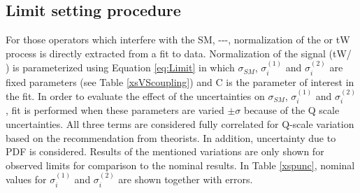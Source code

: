 \subsection {Limit setting procedure}
\label{tW_limit_set}
For those operators which interfere with the SM, \CG-\CtG-\Cphiq-\CtW, normalization of the \ttbar or tW process is directly extracted from a fit to data.
Normalization of the signal (tW/ \ttbar) is parameterized using Equation \ref{eq:Limit} in which $\sigma_{SM}$, $\sigma_i^{(1)}$ and $\sigma_{i}^{(2)}$ are fixed parameters (see Table \ref{xsVScoupling}) and C is the parameter of interest in the fit.
In order to evaluate the effect of the uncertainties on $\sigma_{SM}$, $\sigma_i^{(1)}$ and $\sigma_{i}^{(2)}$, fit is performed when these parameters are varied $\pm\sigma$ because of the Q scale uncertainties.
All three terms are considered fully correlated for Q-scale variation based on the recommendation from theorists.
In addition, uncertainty due to PDF is considered. Results of the mentioned variations are only shown for observed limits for comparison to the nominal results.
In Table \ref{xspunc}, nominal values for $\sigma_i^{(1)}$ and $\sigma_{i}^{(2)}$ are shown together with errors.

\begin{table}[h]
\centering
{}
\caption{Cross sections for \ttbar and tW production [in pb] for the various effective couplings for $\Lambda$  = 1 TeV together with Q-scale errors.}
\label{xspunc}
\end{table}


